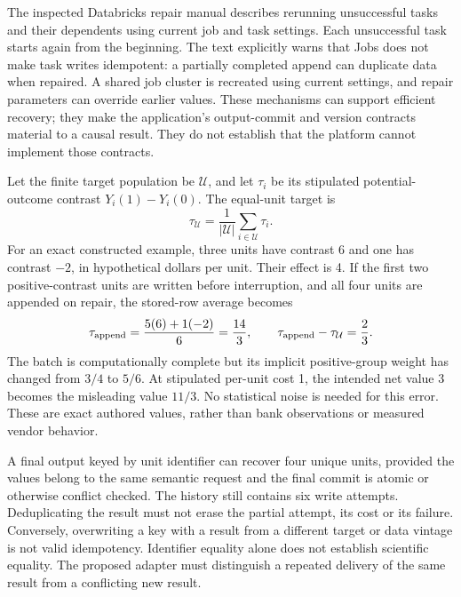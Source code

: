 The inspected Databricks repair manual describes rerunning unsuccessful tasks
and their dependents using current job and task settings. Each unsuccessful
task starts again from the beginning. The text explicitly warns that Jobs does
not make task writes idempotent: a partially completed append can duplicate data
when repaired. A shared job cluster is recreated using current settings, and
repair parameters can override earlier values. These mechanisms can support
efficient recovery; they make the application's output-commit and version
contracts material to a causal result. They do not establish that the platform
cannot implement those contracts.~\citep{exec22_workflow_databricks_repair}

Let the finite target population be $\mathcal U$, and let $\tau_i$ be its
stipulated potential-outcome contrast $Y_i(1)-Y_i(0)$. The equal-unit target is
\begin{equation}
 \tau_{\mathcal U}=\frac{1}{|\mathcal U|}\sum_{i\in\mathcal U}\tau_i.
 \label{exec22:workflow-target}
\end{equation}
For an exact constructed example, three units have contrast 6 and one has
contrast $-2$, in hypothetical dollars per unit. Their effect is 4. If the
first two positive-contrast units are written before interruption, and all
four units are appended on repair, the stored-row average becomes
\begin{equation}
 \tau_{\rm append}=\frac{5(6)+1(-2)}{6}=\frac{14}{3},
 \qquad \tau_{\rm append}-\tau_{\mathcal U}=\frac{2}{3}.
 \label{exec22:workflow-duplicates}
\end{equation}
The batch is computationally complete but its implicit positive-group weight
has changed from $3/4$ to $5/6$. At stipulated per-unit cost 1, the intended
net value 3 becomes the misleading value $11/3$. No statistical noise is
needed for this error. These are exact authored values, rather than bank
observations or measured vendor behavior.~\citep{exec22_workflow_reference}

A final output keyed by unit identifier can recover four unique units, provided
the values belong to the same semantic request and the final commit is atomic
or otherwise conflict checked. The history still contains six write attempts.
Deduplicating the result must not erase the partial attempt, its cost or its
failure. Conversely, overwriting a key with a result from a different target
or data vintage is not valid idempotency. Identifier equality alone does not
establish scientific equality. The proposed adapter must distinguish a repeated
delivery of the same result from a conflicting new result.


